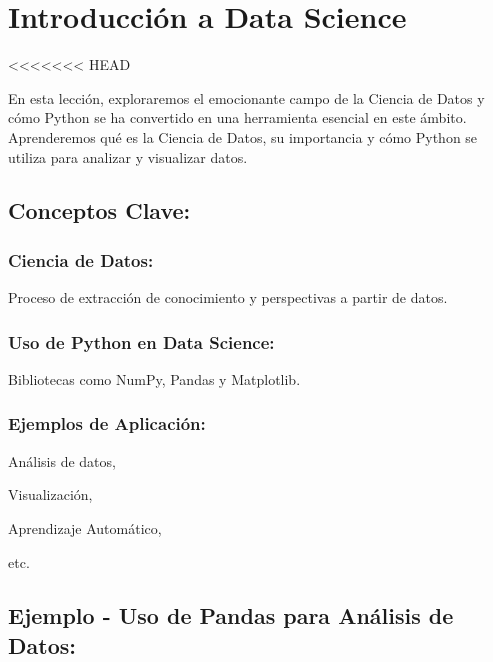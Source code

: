 \documentclass[
  a4paper,
  onepage,
  openany]{scrreprt}
\begin{document}
\hypertarget{introducciuxf3n-a-data-science}{%
\chapter{Introducción a Data
Science}\label{introducciuxf3n-a-data-science}}

\textless\textless\textless\textless\textless\textless\textless{} HEAD

En esta lección, exploraremos el emocionante campo de la Ciencia de
Datos y cómo Python se ha convertido en una herramienta esencial en este
ámbito. Aprenderemos qué es la Ciencia de Datos, su importancia y cómo
Python se utiliza para analizar y visualizar datos.

\hypertarget{conceptos-clave-62}{%
\section{Conceptos Clave:}\label{conceptos-clave-62}}

\hypertarget{ciencia-de-datos}{%
\subsection{Ciencia de Datos:}\label{ciencia-de-datos}}

Proceso de extracción de conocimiento y perspectivas a partir de datos.

\hypertarget{uso-de-python-en-data-science}{%
\subsection{Uso de Python en Data
Science:}\label{uso-de-python-en-data-science}}

Bibliotecas como NumPy, Pandas y Matplotlib.

\hypertarget{ejemplos-de-aplicaciuxf3n}{%
\subsection{Ejemplos de Aplicación:}\label{ejemplos-de-aplicaciuxf3n}}

Análisis de datos,

Visualización,

Aprendizaje Automático,

etc.

\hypertarget{ejemplo---uso-de-pandas-para-anuxe1lisis-de-datos}{%
\section{Ejemplo - Uso de Pandas para Análisis de
Datos:}\label{ejemplo---uso-de-pandas-para-anuxe1lisis-de-datos}}
\end{document}
